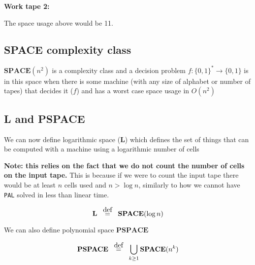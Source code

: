 \documentclass{article}
\newcommand\defeq{\stackrel{\mathclap{\normalfont\mbox{def}}}{=}}
\begin{document}
  \textbf{Work tape 2:}
  \begin{center}



  \end{center}

  The space usage above would be 11.

  \subsection{\textbf{SPACE} complexity class}

  $\mathbf{SPACE} (n^{2})$ is a complexity class and a decision problem $f: \{ 0,1 \}^{*} \rightarrow \{ 0,1 \}  $ is in this space when there is some machine (with any size of alphabet or number of tapes) that decides it ($f$) and has a worst case space usage in $O(n^{2})$


  \subsection{\textbf{L} and \textbf{PSPACE} }

  We can now define logarithmic space ($\mathbf{L} $) which defines the set of things that can be computed with a machine using a logarithmic number of cells

  \textbf{Note: this relies on the fact that we do not count the number of cells on the input tape.} This is because if we were to count the input tape there would be at least $n$ cells used and $n > \log n$, similarly to how we cannot have \texttt{PAL} solved in less than linear time.

  \[
    \mathbf{L}  \;\;\; \defeq  \;\;\; \mathbf{SPACE}(\log n)
  \]

  We can also define polynomial space $\mathbf{PSPACE} $

  \[
    \mathbf{PSPACE} \;\;\; \defeq \;\;\; \bigcup_{k\geq1} \mathbf{SPACE} (n^{k})
  \]
\end{document}

